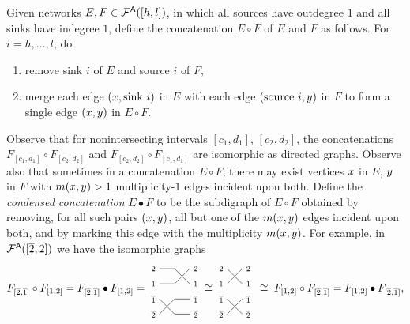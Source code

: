 \documentclass[11pt]{article}
\theoremstyle{definition}
\numberwithin{equation}{section}
\begin{document}
Given networks $E, F \in \mathcal F^{\mathsf{A}}([h,l])$,
in which all sources have
outdegree $1$ and all sinks have indegree $1$, define
the concatenation $E \circ F$ of $E$ and $F$
as follows.  For $i = h,\dotsc, l$, do
\begin{enumerate}
\item remove sink $i$ of $E$ and source $i$ of $F$,
\item merge each edge $(x, \text{sink }i)$ in $E$ with each edge
  $( \text{source }i, y )$ in $F$
  to form a single edge $(x, y)$ in $E \circ F$.
\end{enumerate}
Observe that for
nonintersecting intervals $[c_1,d_1]$, $[c_2,d_2]$,
the concatenations
$F_{[c_1,d_1]} \circ F_{[c_2,d_2]}$ and 
$F_{[c_2,d_2]} \circ F_{[c_1,d_1]}$ are
isomorphic as directed graphs.
Observe also that sometimes in a concatenation $E \circ F$,
there may exist vertices $x$ in $E$, $y$ in $F$
with
$m(x, y) > 1$ multiplicity-$1$ edges
incident upon both.
Define the {\em condensed concatenation}
$E \bullet F$ to be the
subdigraph of $E \circ F$ obtained
by removing, for all such pairs $(x, y)$,
all but one of the $m(x, y)$ edges incident upon both,
and by marking this edge with the multiplicity $m(x, y)$.
For example, in $\mathcal F^{\mathsf{A}}([\overline{2},2])$ we have the isomorphic graphs
\begin{equation}\label{eq:allbutone1}
F_{[\ol2,\ol1]} \circ F_{[1,2]} =
F_{[\ol2,\ol1]} \bullet F_{[1,2]} =
\begin{tikzpicture}[scale=.5,baseline=0]
\node at (-.4,1.5) {$\scriptstyle 2$};
\node at (-.4,0.5) {$\scriptstyle 1$};
\node at (-.4,-0.5) {$\scriptstyle{\ol1}$};
\node at (-.4,-1.5) {$\scriptstyle{\ol2}$};  
\node at (2.4,1.5) {$\scriptstyle 2$};
\node at (2.4,0.5) {$\scriptstyle 1$};
\node at (2.4,-0.5) {$\scriptstyle{\ol1}$};
\node at (2.4,-1.5) {$\scriptstyle{\ol2}$};  
\draw[-] (0,1.5) -- (1,1.5) -- (2,0.5);
\draw[-] (0,0.5) -- (1,0.5) -- (2,1.5);
\draw[-] (0,-0.5) -- (1,-1.5) -- (2,-1.5);
\draw[-] (0,-1.5) -- (1,-0.5) -- (2,-0.5);
\end{tikzpicture}
\cong
\begin{tikzpicture}[scale=.5,baseline=0]
\node at (-.4,1.5) {$\scriptstyle 2$};
\node at (-.4,0.5) {$\scriptstyle 1$};
\node at (-.4,-0.5) {$\scriptstyle{\ol1}$};
\node at (-.4,-1.5) {$\scriptstyle{\ol2}$};  
\node at (1.4,1.5) {$\scriptstyle 2$};
\node at (1.4,0.5) {$\scriptstyle 1$};
\node at (1.4,-0.5) {$\scriptstyle{\ol1}$};
\node at (1.4,-1.5) {$\scriptstyle{\ol2}$};  
\draw[-] (0,1.5) -- (1,0.5);%
\draw[-] (0,0.5) -- (1,1.5);%
\draw[-] (0,-0.5) -- (1,-1.5);%
\draw[-] (0,-1.5) -- (1,-0.5);%
\end{tikzpicture}
\;\cong\;
F_{[1,2]} \circ F_{[\ol2,\ol1]} =
F_{[1,2]} \bullet F_{[\ol2,\ol1]},
\end{equation}
\end{document}
